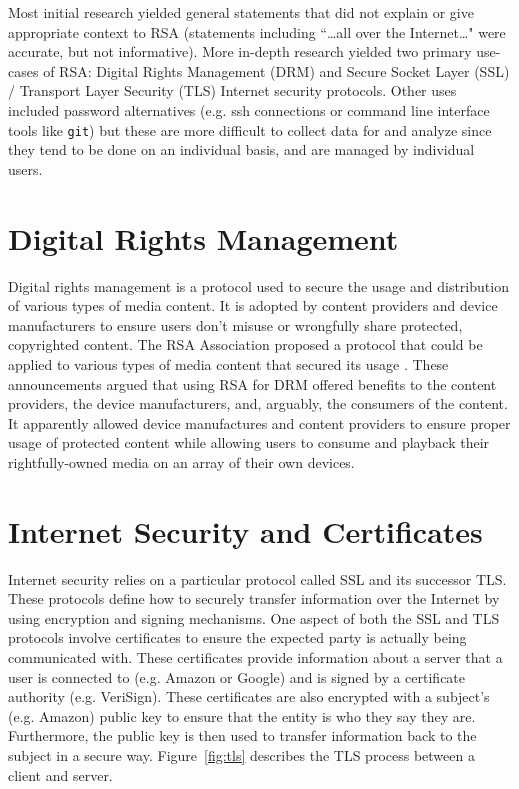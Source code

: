 \documentclass[12pt]{ucthesis}
\begin{document}
Most initial research yielded general statements that did not explain or give
appropriate context to RSA (statements including ``\dots all over the
Internet\dots" were accurate, but not informative). More in-depth research
yielded two primary use-cases of RSA: Digital Rights Management (DRM) and
Secure Socket Layer (SSL) / Transport Layer Security (TLS) Internet
security protocols. Other uses included password alternatives (e.g. ssh
connections or command line interface tools like \texttt{git}) but these are
more difficult to collect data for and analyze since they tend to be done on
an individual basis, and are managed by individual users.

\section{Digital Rights Management}
\label{subsec:drm}
Digital rights management is a protocol used to secure the usage and
distribution of various types of media content. It is adopted by content
providers and device manufacturers to ensure users don't misuse or wrongfully 
share protected, copyrighted content.
The RSA Association proposed a protocol that could be applied to various types
of media content that secured its usage
\citep{rsa2004announces,rsa2004supports}. These announcements argued that
using RSA for DRM offered benefits to the content providers, the device
manufacturers, and, arguably, the consumers of the content. It apparently
allowed device manufactures and content providers to ensure proper usage of
protected content while allowing users to consume and playback their
rightfully-owned media on an array of their own devices.

\section{Internet Security and Certificates}
\label{subsec:netsec}
Internet security relies on a particular protocol called SSL and its successor
TLS. These protocols define how to securely transfer information over the
Internet by using encryption and signing mechanisms. One aspect of both the SSL
and TLS protocols involve certificates to ensure the expected party is
actually being communicated with. These certificates provide information
about a server that a user is connected to (e.g. Amazon or Google)
and is signed by a certificate authority (e.g. VeriSign). These certificates
are also encrypted with a subject's (e.g. Amazon) public key to ensure that
the entity is who they say they are. Furthermore, the public key is then used 
to transfer information back to the subject in a secure way.
Figure~\ref{fig:tls} describes the TLS process between a client and server. 
\end{document}
